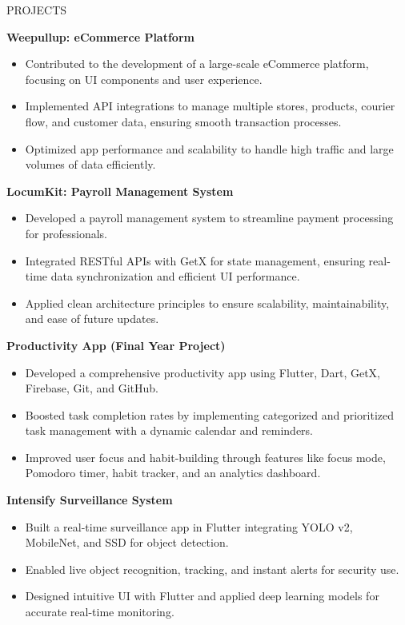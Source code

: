 \documentclass{resume} %
\begin{document}
 \begin{rSection}{PROJECTS}

\textbf{Weepullup: eCommerce Platform} \hfill {}
\begin{itemize}
\item Contributed to the development of a large-scale eCommerce platform, focusing on UI components and user experience.
\item Implemented API integrations to manage multiple stores, products, courier flow, and customer data, ensuring smooth transaction processes.
\item Optimized app performance and scalability to handle high traffic and large volumes of data efficiently.
\end{itemize}

\vspace{0.8em}

\textbf{LocumKit: Payroll Management System} \hfill {}
\begin{itemize}
\item Developed a payroll management system to streamline payment processing for professionals.
\item Integrated RESTful APIs with GetX for state management, ensuring real-time data synchronization and efficient UI performance.
\item Applied clean architecture principles to ensure scalability, maintainability, and ease of future updates.
\end{itemize}

\vspace{4em}

\textbf{Productivity App (Final Year Project)} \hfill {}
\begin{itemize}
\item Developed a comprehensive productivity app using Flutter, Dart, GetX, Firebase, Git, and GitHub.
\item Boosted task completion rates by implementing categorized and prioritized task management with a dynamic calendar and reminders.
\item Improved user focus and habit-building through features like focus mode, Pomodoro timer, habit tracker, and an analytics dashboard.
\end{itemize}

\vspace{0.8em}

\textbf{Intensify Surveillance System} \hfill {}
\begin{itemize}
\item Built a real-time surveillance app in Flutter integrating YOLO v2, MobileNet, and SSD for object detection.
\item Enabled live object recognition, tracking, and instant alerts for security use.
\item Designed intuitive UI with Flutter and applied deep learning models for accurate real-time monitoring.
\end{itemize}


\end{rSection}
\end{document}
